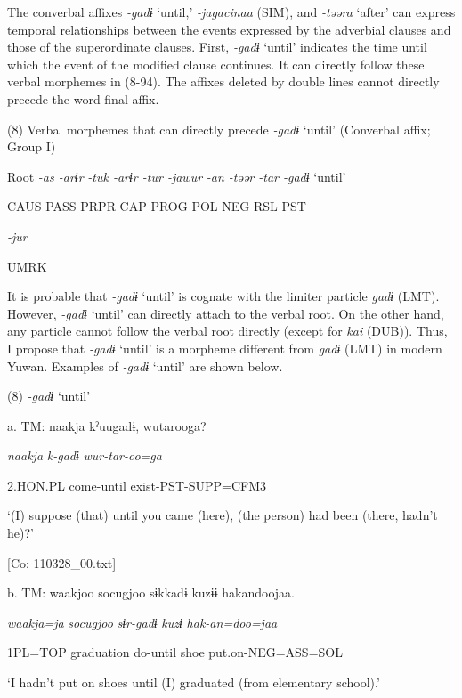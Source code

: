 The converbal affixes \textit{{}-gadɨ} ‘until,’ \textit{{}-jagacinaa} (SIM), and \textit{{}-təəra} ‘after’ can express temporal relationships between the events expressed by the adverbial clauses and those of the superordinate clauses. First, \textit{{}-gadɨ} ‘until’ indicates the time until which the event of the modified clause continues. It can directly follow these verbal morphemes in (8-94). The affixes deleted by double lines cannot directly precede the word-final affix.

(8)  Verbal morphemes that can directly precede \textit{{}-gadɨ} ‘until’ (Converbal affix; Group I)

  Root  \textit{{}-as  {}-arɨr} %
\textit{{}-tuk  {}-arɨr  {}-tur  {}-jawur} %
\textit{{}-an  {}-təər  {}-tar  {}-gadɨ} ‘until’

    CAUS  PASS  PRPR  CAP  PROG  POL  NEG  RSL  PST  

          \textit{{}-jur} 

          UMRK    

It is probable that \textit{{}-gadɨ} ‘until’ is cognate with the limiter particle \textit{gadɨ} (LMT). However, \textit{{}-gadɨ} ‘until’ can directly attach to the verbal root. On the other hand, any particle cannot follow the verbal root directly (except for \textit{kai} (DUB)). Thus, I propose that \textit{{}-gadɨ} ‘until’ is a morpheme different from \textit{gadɨ} (LMT) in modern Yuwan. Examples of \textit{{}-gadɨ} ‘until’ are shown below.

(8)  \textit{{}-gadɨ} ‘until’

  a.  TM:  naakja  kˀuugadɨ,  wutarooga?

      \textit{naakja}  \textit{k-gadɨ}  \textit{wur-tar-oo=ga}

      2.HON.PL  come-until  exist-PST-SUPP=CFM3

      ‘(I) suppose (that) until you came (here), (the person) had been (there, hadn’t he)?’

      [Co: 110328\_00.txt]

  b.  TM:  waakjoo  {\textbar}socugjoo{\textbar}  sɨkkadɨ  kuzɨɨ  hakandoojaa.

      \textit{waakja=ja}  \textit{socugjoo}  \textit{sɨr-gadɨ}  \textit{kuzɨ}  \textit{hak-an=doo=jaa}

      1PL=TOP  graduation  do-until  shoe  put.on-NEG=ASS=SOL

      ‘I hadn’t put on shoes until (I) graduated (from elementary school).’

